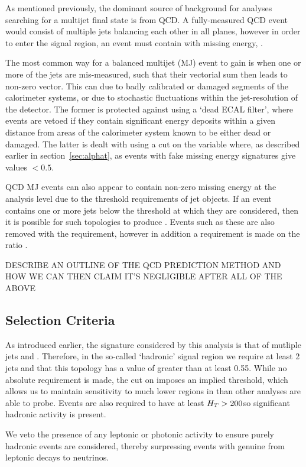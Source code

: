 As mentioned previously, the dominant source of background for analyses 
searching for a multijet final state is from QCD. A fully-measured QCD event 
would consist of multiple jets balancing each other in all planes, however in 
order to enter the signal region, an event must contain with missing energy, 
\mht.

The most common way for a balanced multijet (MJ) event to gain \mht is when one 
or more of the jets are mis-measured, such that their vectorial sum then leads to non-zero
\mht vector. This can due to badly calibrated or damaged segments of the calorimeter 
systems, or due to stochastic fluctuations within the jet-resolution of the 
detector. The former is protected against using a `dead ECAL filter', where 
events are vetoed if they contain significant energy deposits within a given 
distance from areas of the calorimeter system known to be either dead or 
damaged. The latter is dealt with using a cut on the \alphat variable where, as described
earlier in section~\ref{sec:alphat}, as events with fake missing energy signatures
give values $<0.5$.

QCD MJ events can also appear to contain non-zero missing energy at the analysis
level due to the threshold requirements of jet objects. If an event contains 
one or more jets below the threshold at which they are considered, then it is 
possible for such topologies to produce \mht. Events such as these are also 
removed with the \alphat requirement, however in addition a requirement is made on the
ratio \mhtmet.

DESCRIBE AN OUTLINE OF THE QCD PREDICTION METHOD AND HOW WE CAN THEN CLAIM IT'S 
NEGLIGIBLE AFTER ALL OF THE ABOVE

\subsection{Selection Criteria}
\label{sec:selec_crit}
As introduced earlier, the signature considered by this analysis is that of 
mutliple jets and \met. Therefore, in the so-called `hadronic' signal region we 
require at least 2 jets and that this topology has a value of \alphat greater than
at least 0.55. While no absolute \met requirement is made, the cut on 
\alphat imposes an implied threshold, which allows us to maintain 
sensitivity to much lower regions in \met than other analyses are able to 
probe. Events are also required to have at least $H_T > 200$\gev so significant
hadronic activity is present.

We veto the presence of any leptonic or 
photonic activity to ensure purely hadronic events are considered, thereby 
surpressing events with genuine \met from leptonic decays to neutrinos.

